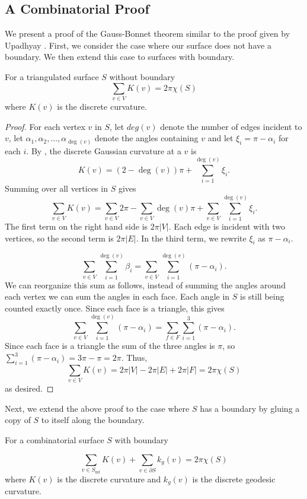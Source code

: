 \subsection{A Combinatorial Proof}
\label{sec:proof}


We present a proof of the Gauss-Bonnet theorem similar to the proof given by Upadhyay \cite{upadhyay2015}.
First, we consider the case where our surface does not have a boundary.
We then extend this case to surfaces with boundary.
\begin{theorem}\label{thm:g-b-discete-bdy}
For a triangulated surface $S$ without boundary
$$\sum_{v\in V} K(v)=2\pi \chi(S)$$
where $K(v)$ is the discrete curvature.
\end{theorem}

\begin{proof}

For each vertex $v$ in $S$,
let $deg(v)$ denote the number of edges incident to $v$, let $\alpha_1,\alpha_2,\ldots,\alpha_{\deg{(v)}}$ denote the angles
containing $v$ and let $\xi_i=\pi-\alpha_i$ for each $i$.
By , 
the discrete Gaussian curvature at a $v$ is
 $$K(v)=(2-\deg{(v)})\pi +\sum_{i=1}^{\deg{(v)}} \xi_i.$$
Summing over all vertices in $S$ gives
$$\sum_{v\in V} K(v)=\sum_{v\in V}2\pi - \sum_{v\in V}\deg{(v)}\pi+\sum_{v\in V}\sum_{i=1}^{\deg{(v)}} \xi_i.$$
The first term on the right hand side is $2\pi |V|$. Each edge is incident with two vertices, so the second term is $2\pi |E|$. 
In the third term, we rewrite $\xi_i$ as $\pi-\alpha_i$.

$$ \sum_{v\in V}\sum_{i=1}^{\deg{(v)}} \beta_i= \sum_{v\in V}\sum_{i=1}^{\deg{(v)}} (\pi-\alpha_i).$$
We can reorganize this sum as follows, instead of summing the angles around each vertex we can sum the angles in each face.
Each angle in $S$ is still being counted exactly once. 
Since each face is a triangle, this gives
$$\sum_{v\in V}\sum_{i=1}^{\deg{(v)}} (\pi-\alpha_i)=\sum_{f\in F}\sum_{i=1}^3(\pi-\alpha_i).$$
Since each face is a triangle the sum of the three angles is $\pi$,
so $\sum_{i=1}^3(\pi-\alpha_i)=3\pi-\pi=2\pi.$
Thus, $$\sum_{v\in V} K(v)=2\pi |V|-2\pi |E|+2\pi |F|=2\pi \chi(S)$$ as desired.
\end{proof}

Next, we extend the above proof to the case where $S$ has a boundary
by gluing a copy of $S$ to itself along the boundary.

\begin{theorem}\label{thm:g-b-discete}
For a combinatorial surface $S$ with boundary

$$\sum_{v\in S_{\text{int}}} K(v)+\sum_{v\in\partial S}k_g(v)=2\pi \chi(S)$$
where $K(v)$ is the discrete curvature and $k_g(v)$ is the discrete geodesic curvature.
\end{theorem}

